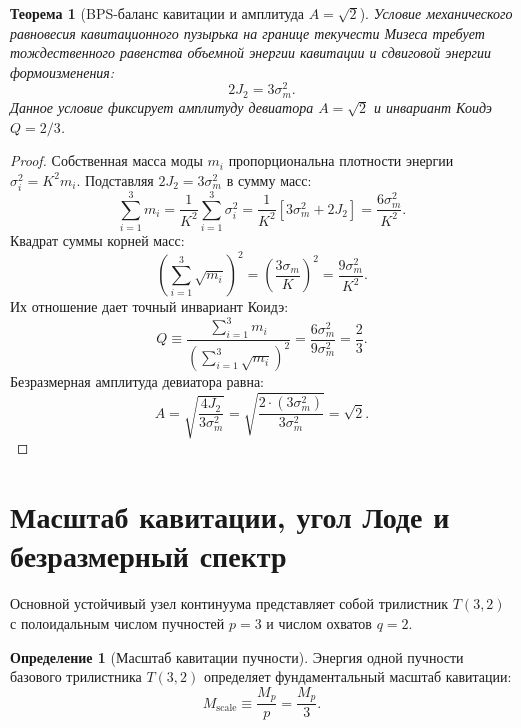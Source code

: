 \documentclass[11pt,a4paper]{article}
\newtheorem{theorem}{Теорема}
\theoremstyle{definition}
\newtheorem{definition}{Определение}
\theoremstyle{remark}
\begin{document}
\begin{theorem}[BPS-баланс кавитации и амплитуда $A = \sqrt{2}$]
\label{thm:koide_mises}
Условие механического равновесия кавитационного пузырька на границе текучести Мизеса требует тождественного равенства объемной энергии кавитации и сдвиговой энергии формоизменения:
\begin{equation}
    2 J_2 = 3 \sigma_m^2.
\end{equation}
Данное условие фиксирует амплитуду девиатора $A = \sqrt{2}$ и инвариант Коидэ $Q = 2/3$.
\end{theorem}
\begin{proof}
Собственная масса моды $m_i$ пропорциональна плотности энергии $\sigma_i^2 = K^2 m_i$. Подставляя $2 J_2 = 3 \sigma_m^2$ в сумму масс:
\begin{equation}
    \sum_{i=1}^3 m_i = \frac{1}{K^2} \sum_{i=1}^3 \sigma_i^2 = \frac{1}{K^2} [3\sigma_m^2 + 2 J_2] = \frac{6 \sigma_m^2}{K^2}.
\end{equation}
Квадрат суммы корней масс:
\begin{equation}
    \left( \sum_{i=1}^3 \sqrt{m_i} \right)^2 = \left( \frac{3\sigma_m}{K} \right)^2 = \frac{9\sigma_m^2}{K^2}.
\end{equation}
Их отношение дает точный инвариант Коидэ:
\begin{equation}
    Q \equiv \frac{\sum_{i=1}^3 m_i}{\left( \sum_{i=1}^3 \sqrt{m_i} \right)^2} = \frac{6 \sigma_m^2}{9 \sigma_m^2} = \frac{2}{3}.
\end{equation}
Безразмерная амплитуда девиатора равна:
\begin{equation}
    A = \sqrt{\frac{4 J_2}{3 \sigma_m^2}} = \sqrt{\frac{2 \cdot (3\sigma_m^2)}{3\sigma_m^2}} = \sqrt{2}.
\end{equation}
\end{proof}

\section{Масштаб кавитации, угол Лоде и безразмерный спектр}
Основной устойчивый узел континуума представляет собой трилистник $T(3,2)$ с полоидальным числом пучностей $p=3$ и числом охватов $q=2$. 

\begin{definition}[Масштаб кавитации пучности]
Энергия одной пучности базового трилистника $T(3,2)$ определяет фундаментальный масштаб кавитации:
\begin{equation}
    M_{\mathrm{scale}} \equiv \frac{M_p}{p} = \frac{M_p}{3}.
\end{equation}
\end{definition}
\end{document}
